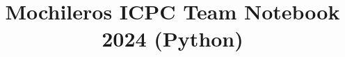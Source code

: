\documentclass[10pt]{article}
\title{\vspace{-4ex}\Large{Mochileros ICPC Team Notebook 2024 (Python)}}
\author{}
\date{}
\begin{document}
\begin{landscape}
\begin{multicols}{2}

\maketitle
\vspace{-13ex}
\tableofcontents
\pagestyle{fancy}



\end{multicols}
\end{landscape}

\end{document}
